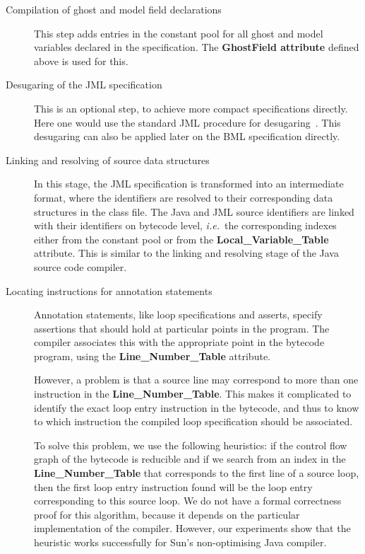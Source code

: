 \begin{description}

\item[Compilation of ghost and model field declarations] This step
adds entries in the constant pool for all ghost and model variables
declared in the specification. The \textbf{Ghost\unsc Field \unsc
attribute} defined above is used for this. 

\item [Desugaring of the JML specification] This is an optional step,
to achieve more compact specifications directly. Here one would use
the standard JML procedure for desugaring~\cite{RaghavanL00}. This
desugaring can also be applied later on the BML specification directly.

\item[Linking and resolving of source data structures]
In this stage, the JML specification is transformed into an
intermediate format, where the identifiers are resolved to their
corresponding data structures in the class file.  The Java and JML
source identifiers are linked with their identifiers on bytecode
level, \emph{i.e.}\ the corresponding indexes either from the constant
pool or from the \textbf{Local\_Variable\_Table} attribute. This is
similar to the linking and resolving stage of the Java source code
compiler. 

\item[Locating instructions for annotation statements] 
Annotation statements, like loop specifications and asserts, specify
assertions that should hold at particular points in the program. The
compiler associates this with the appropriate point in the bytecode
program, using the \textbf{Line\_Number\_Table} attribute.

However, a problem is that a source line may correspond to more than
one instruction in the \textbf{Line\_Number\_Table}. This makes it
complicated to identify the exact loop entry instruction in the
bytecode, and thus to know to which instruction the compiled loop
specification should be associated. 
 
To solve this problem, we use the following heuristics: if the control
flow graph of the bytecode is reducible and if we search from an index
in the \textbf{Line\_Number\_Table} that corresponds to the first line
of a source loop, then the first loop entry instruction found will be
the loop entry corresponding to this source loop.  We do not have a
formal correctness proof for this algorithm, because it depends on the
particular implementation of the compiler.  However, our experiments
show that the heuristic works successfully for Sun's non-optimising
Java compiler.
 

\end{description}
